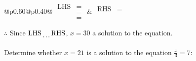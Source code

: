 \documentclass[12pt]{article}
\newcounter{minipagecount}
\begin{document}
\begin{multicols}{2}
\begin{minipage}[t]{0.40\textwidth}
    \noindent
    \renewcommand{\arraystretch}{1.3} %
    \begin{tabular}{@{}p{0.60\linewidth}@{}p{0.40\linewidth}@{}}
        \(\begin{aligned}
            \text{LHS} &=  \\
                    &=  \\
                    &= 
        \end{aligned}\) &
        \(\begin{aligned}
            \text{RHS} &= \\
                    & \\
                    &
        \end{aligned}\)
    \end{tabular}
    \renewcommand{\arraystretch}{1.0} %
    \vspace{2pt}  %

    \noindent \(\therefore\) Since \(\text{LHS} \dotuline{\hspace{5mm}} \text{RHS}\), \(x = 30\) \dotuline{\hspace{12mm}} a solution to the equation.

\end{minipage}

\vspace*{0.5ex}
\vfill{}
\noindent{(\theminipagecount)}\hspace{0.1mm} %
\begin{minipage}[t]{0.40\textwidth} %

    \noindent Determine whether \(x = 21\) is a solution to the equation \(\frac{x}{3} = 7\):
    \vspace{2pt}  %


\end{minipage}
\end{multicols}
\end{document}
